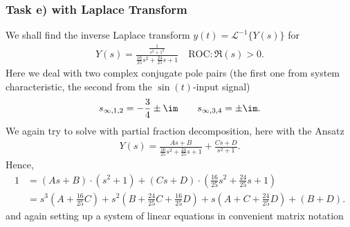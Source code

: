 \subsubsection{Task e) with Laplace Transform}
\label{sec:task_e_Laplace}
We shall find the inverse Laplace transform $y(t) = \mathcal{L}^{-1}\{Y(s)\}$
for
\begin{align}
Y(s) = \frac{\frac{1}{s^2 + 1^2}}{\frac{16}{25} s^2 + \frac{24}{25} s + 1}
\quad \text{ROC}: \Re(s) > 0.
\end{align}
Here we deal with two complex conjugate pole pairs (the first one from system
characteristic, the second from the $\sin(t)$-input signal)
\begin{align}
s_{\infty,1,2} = -\frac{3}{4} \pm \im \qquad s_{\infty,3,4} = \pm \im.
\end{align}
We again try to solve with partial fraction decomposition, here with the Ansatz
\begin{align}
Y(s) = \frac{A s + B}{\frac{16}{25} s^2 + \frac{24}{25} s + 1}+
\frac{C s + D}{s^2+1}.
\end{align}
Hence,
\begin{align}
1&=
(A s + B) \cdot (s^2+1)+
(C s + D) \cdot (\frac{16}{25} s^2 + \frac{24}{25} s + 1) \nonumber \\
&= s^3(A+\frac{16}{25}C)+s^2(B+\frac{24}{25}C+\frac{16}{25}D)+s(A+C+\frac{24}{25}D)+(B+D).
\end{align}
and again setting up a system of linear equations in convenient matrix notation
